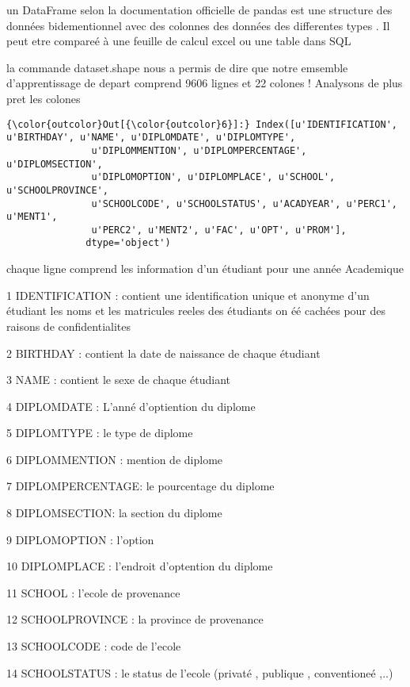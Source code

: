 \documentclass[11pt]{article}
\begin{document}
un DataFrame selon la documentation officielle de pandas est une
structure des données bidementionnel avec des colonnes des données des
differentes types . Il peut etre compareé à une feuille de calcul excel
ou une table dans SQL

    la commande dataset.shape nous a permis de dire que notre emsemble
d'apprentissage de depart comprend 9606 lignes et 22 colones ! Analysons
de plus pret les colones

            \begin{Verbatim}[commandchars=\\\{\}]
{\color{outcolor}Out[{\color{outcolor}6}]:} Index([u'IDENTIFICATION', u'BIRTHDAY', u'NAME', u'DIPLOMDATE', u'DIPLOMTYPE',
               u'DIPLOMMENTION', u'DIPLOMPERCENTAGE', u'DIPLOMSECTION',
               u'DIPLOMOPTION', u'DIPLOMPLACE', u'SCHOOL', u'SCHOOLPROVINCE',
               u'SCHOOLCODE', u'SCHOOLSTATUS', u'ACADYEAR', u'PERC1', u'MENT1',
               u'PERC2', u'MENT2', u'FAC', u'OPT', u'PROM'],
              dtype='object')
\end{Verbatim}
        
    chaque ligne comprend les information d'un étudiant pour une année
Academique

    1 IDENTIFICATION : contient une identification unique et anonyme d'un
étudiant les noms et les matricules reeles des étudiants on éé cachées
pour des raisons de confidentialites

2 BIRTHDAY : contient la date de naissance de chaque étudiant

3 NAME : contient le sexe de chaque étudiant

4 DIPLOMDATE : L'anné d'optiention du diplome

5 DIPLOMTYPE : le type de diplome

6 DIPLOMMENTION : mention de diplome

7 DIPLOMPERCENTAGE: le pourcentage du diplome

8 DIPLOMSECTION: la section du diplome

9 DIPLOMOPTION : l'option

10 DIPLOMPLACE : l'endroit d'optention du diplome

11 SCHOOL : l'ecole de provenance

12 SCHOOLPROVINCE : la province de provenance

13 SCHOOLCODE : code de l'ecole

14 SCHOOLSTATUS : le status de l'ecole (privaté , publique ,
conventioneé ,..)
\end{document}
